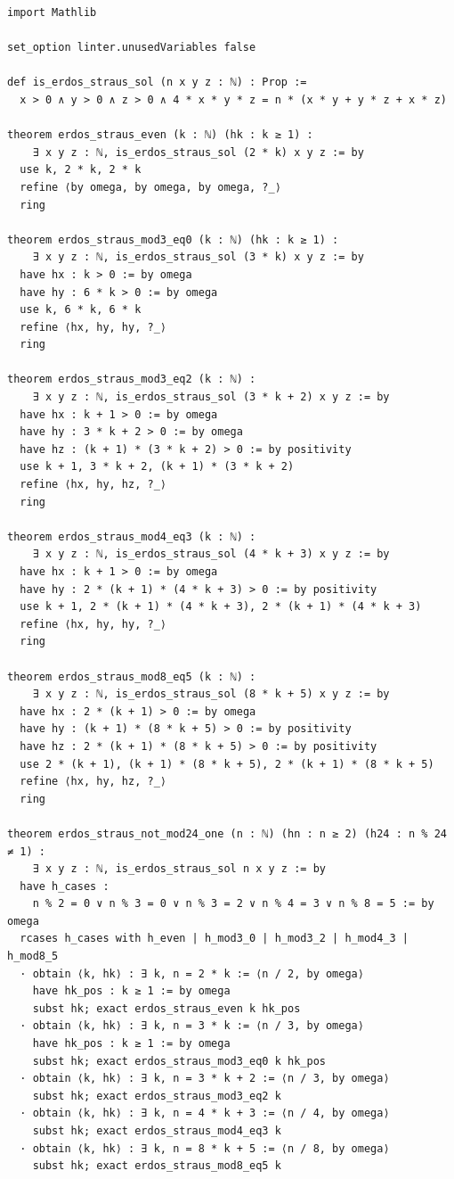 \documentclass[11pt,a4paper]{article}
\theoremstyle{definition}
\begin{document}
\begin{lstlisting}[caption={Lean 4 Source Code for the Master Modulo 24 Theorem}]
import Mathlib

set_option linter.unusedVariables false

def is_erdos_straus_sol (n x y z : ℕ) : Prop :=
  x > 0 ∧ y > 0 ∧ z > 0 ∧ 4 * x * y * z = n * (x * y + y * z + x * z)

theorem erdos_straus_even (k : ℕ) (hk : k ≥ 1) :
    ∃ x y z : ℕ, is_erdos_straus_sol (2 * k) x y z := by
  use k, 2 * k, 2 * k
  refine ⟨by omega, by omega, by omega, ?_⟩
  ring

theorem erdos_straus_mod3_eq0 (k : ℕ) (hk : k ≥ 1) :
    ∃ x y z : ℕ, is_erdos_straus_sol (3 * k) x y z := by
  have hx : k > 0 := by omega
  have hy : 6 * k > 0 := by omega
  use k, 6 * k, 6 * k
  refine ⟨hx, hy, hy, ?_⟩
  ring

theorem erdos_straus_mod3_eq2 (k : ℕ) :
    ∃ x y z : ℕ, is_erdos_straus_sol (3 * k + 2) x y z := by
  have hx : k + 1 > 0 := by omega
  have hy : 3 * k + 2 > 0 := by omega
  have hz : (k + 1) * (3 * k + 2) > 0 := by positivity
  use k + 1, 3 * k + 2, (k + 1) * (3 * k + 2)
  refine ⟨hx, hy, hz, ?_⟩
  ring

theorem erdos_straus_mod4_eq3 (k : ℕ) :
    ∃ x y z : ℕ, is_erdos_straus_sol (4 * k + 3) x y z := by
  have hx : k + 1 > 0 := by omega
  have hy : 2 * (k + 1) * (4 * k + 3) > 0 := by positivity
  use k + 1, 2 * (k + 1) * (4 * k + 3), 2 * (k + 1) * (4 * k + 3)
  refine ⟨hx, hy, hy, ?_⟩
  ring

theorem erdos_straus_mod8_eq5 (k : ℕ) :
    ∃ x y z : ℕ, is_erdos_straus_sol (8 * k + 5) x y z := by
  have hx : 2 * (k + 1) > 0 := by omega
  have hy : (k + 1) * (8 * k + 5) > 0 := by positivity
  have hz : 2 * (k + 1) * (8 * k + 5) > 0 := by positivity
  use 2 * (k + 1), (k + 1) * (8 * k + 5), 2 * (k + 1) * (8 * k + 5)
  refine ⟨hx, hy, hz, ?_⟩
  ring

theorem erdos_straus_not_mod24_one (n : ℕ) (hn : n ≥ 2) (h24 : n % 24 ≠ 1) :
    ∃ x y z : ℕ, is_erdos_straus_sol n x y z := by
  have h_cases :
    n % 2 = 0 ∨ n % 3 = 0 ∨ n % 3 = 2 ∨ n % 4 = 3 ∨ n % 8 = 5 := by omega
  rcases h_cases with h_even | h_mod3_0 | h_mod3_2 | h_mod4_3 | h_mod8_5
  · obtain ⟨k, hk⟩ : ∃ k, n = 2 * k := ⟨n / 2, by omega⟩
    have hk_pos : k ≥ 1 := by omega
    subst hk; exact erdos_straus_even k hk_pos
  · obtain ⟨k, hk⟩ : ∃ k, n = 3 * k := ⟨n / 3, by omega⟩
    have hk_pos : k ≥ 1 := by omega
    subst hk; exact erdos_straus_mod3_eq0 k hk_pos
  · obtain ⟨k, hk⟩ : ∃ k, n = 3 * k + 2 := ⟨n / 3, by omega⟩
    subst hk; exact erdos_straus_mod3_eq2 k
  · obtain ⟨k, hk⟩ : ∃ k, n = 4 * k + 3 := ⟨n / 4, by omega⟩
    subst hk; exact erdos_straus_mod4_eq3 k
  · obtain ⟨k, hk⟩ : ∃ k, n = 8 * k + 5 := ⟨n / 8, by omega⟩
    subst hk; exact erdos_straus_mod8_eq5 k
\end{lstlisting}
\end{document}
